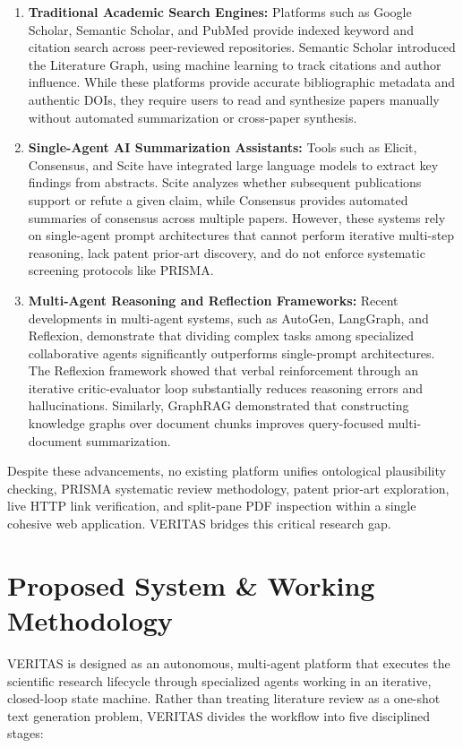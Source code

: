 \documentclass[11pt,a4paper]{article}
\begin{document}
\begin{enumerate}[leftmargin=*,noitemsep]
    \item \textbf{Traditional Academic Search Engines:} Platforms such as Google Scholar, Semantic Scholar, and PubMed provide indexed keyword and citation search across peer-reviewed repositories. Semantic Scholar introduced the Literature Graph, using machine learning to track citations and author influence. While these platforms provide accurate bibliographic metadata and authentic DOIs, they require users to read and synthesize papers manually without automated summarization or cross-paper synthesis.
    \item \textbf{Single-Agent AI Summarization Assistants:} Tools such as Elicit, Consensus, and Scite have integrated large language models to extract key findings from abstracts. Scite analyzes whether subsequent publications support or refute a given claim, while Consensus provides automated summaries of consensus across multiple papers. However, these systems rely on single-agent prompt architectures that cannot perform iterative multi-step reasoning, lack patent prior-art discovery, and do not enforce systematic screening protocols like PRISMA.
    \item \textbf{Multi-Agent Reasoning and Reflection Frameworks:} Recent developments in multi-agent systems, such as AutoGen, LangGraph, and Reflexion, demonstrate that dividing complex tasks among specialized collaborative agents significantly outperforms single-prompt architectures. The Reflexion framework showed that verbal reinforcement through an iterative critic-evaluator loop substantially reduces reasoning errors and hallucinations. Similarly, GraphRAG demonstrated that constructing knowledge graphs over document chunks improves query-focused multi-document summarization.
\end{enumerate}

Despite these advancements, no existing platform unifies ontological plausibility checking, PRISMA systematic review methodology, patent prior-art exploration, live HTTP link verification, and split-pane PDF inspection within a single cohesive web application. VERITAS bridges this critical research gap.

\section{Proposed System \& Working Methodology}
VERITAS is designed as an autonomous, multi-agent platform that executes the scientific research lifecycle through specialized agents working in an iterative, closed-loop state machine. Rather than treating literature review as a one-shot text generation problem, VERITAS divides the workflow into five disciplined stages:
\end{document}
